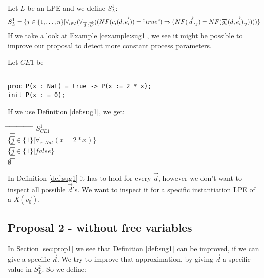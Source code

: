 \index{}\documentclass[a4paper,10pt]{article}
\theoremstyle{plain}
\theoremstyle{definition}
\newcommand{\ovr}{\overrightarrow}
\newcommand{\pps}{process parameters}
\newcommand{\tab}{\hspace*{5.mm} \= \hspace*{5.mm} \= \hspace*{5.mm} \= \hspace*{5.mm} \= \hspace*{5.mm} \= \hspace*{5.mm}  \= \hspace*{5.mm}  \= \hspace*{5.mm}  \= \hspace*{5.mm} \= \hspace*{5.mm} \= \hspace*{5.mm}  \= \hspace*{5.mm}  \= \hspace*{5.mm}\kill}
\begin{document}
\begin{defn} \label{def:sug1} Let $L$ be an LPE and we define $S_L^1$:
\begin{displaymath}
S_L^1 =
\lbrace   
j \in \lbrace 1, \ldots , n \rbrace \vert \forall_{i\in I} (\forall_{\ovr{d}: \ovr{D}}((NF(c_i(\ovr{d,e_i})) = "true")  \Rightarrow (NF(\ovr{d}._j) = NF(\ovr{g_i}(\ovr{d,e_i})._j))))\rbrace
\end{displaymath}
If we take a look at Example \ref{cexample:sug1}, we see it might be possible to improve our proposal to detect more constant \pps .
\begin{example}Let $CE1$ be \label{cexample:sug1}\begin{verbatim}

proc P(x : Nat) = true -> P(x := 2 * x);
init P(x : = 0);

\end{verbatim}
\end{example}
\begin{flushleft}
If we use Definition \ref{def:sug1}, we get:\\
\end{flushleft}
\begin{tabbing}
\tab
\> \> $S_{CE1}^1$\\
\> $\equiv$\\
\> \> $\lbrace j \in \lbrace 1 \rbrace \vert \forall_{x : Nat}( x = 2 \ast x ) \rbrace $\\
\> $\equiv$ \\
\> \> $\lbrace j \in \lbrace 1 \rbrace \vert false \rbrace $\\
\> $\equiv$ \\
\> \> $\emptyset$ \\
\end{tabbing}
In Definition \ref{def:sug1} it has to hold for every $\ovr{d}$, however
we don't want to inspect all possible $\ovr{d}$'s. We want to inspect it for a specific instantiation LPE of a $X(\ovr{v_0})$.
\end{defn}

\subsection{Proposal 2 - without free variables}
In Section \ref{sec:prop1} we see that Definition \ref{def:sug1} can be improved, if we can give a specific $\ovr{d}$. We try to improve that approximation, by giving $\ovr{d}$ a specific value in $S_L^2$. So we define: 
\end{document}
